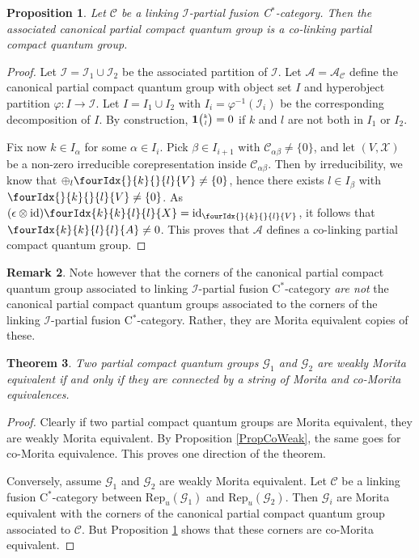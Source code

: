 \documentclass[10pt]{article}
\DeclareMathOperator{\id}{id}
\newcommand{\CatC}{\mathcal{C}}
\newcommand{\CatCC}{\mathscr{C}}
\newcommand{\Rep}{\mathrm{Rep}}
\newcommand{\Grt}[3]{#1{\tiny {\begin{pmatrix} #2\\#3\end{pmatrix}}}}
\newcommand{\UnitC}[2]{\Grt{\mathbf{1}}{#1}{#2}}
\newcommand{\Gr}[5]{\fourIdx{#2}{#4}{#3}{#5}{#1}}%
\newcommand{\Gru}[3]{\Gr{#1}{}{}{#2}{#3}}
\newtheorem{Theorem}{Theorem}[section]
\newtheorem{Prop}[Theorem]{Proposition}
\theoremstyle{definition}
\newtheorem{Rem}[Theorem]{Remark}
\numberwithin{equation}{section}
\begin{document}
\begin{Prop}\label{PropCoLink} Let $\CatCC$ be a linking $\mathscr{I}$-partial fusion C$^*$-category. Then the associated canonical partial compact quantum group is a co-linking partial compact quantum group. 
\end{Prop} 

\begin{proof} Let $\mathscr{I}= \mathscr{I}_1\cup \mathscr{I}_2$ be the associated partition of $\mathscr{I}$. Let $\mathscr{A} = \mathscr{A}_{\CatCC}$ define the canonical partial compact quantum group with object set $I$ and hyperobject partition $\varphi:I\rightarrow \mathscr{I}$. Let $I=I_1\cup I_2$ with $I_i = \varphi^{-1}(\mathscr{I}_i)$ be the corresponding decomposition of $I$. By construction, $\UnitC{k}{l}=0$ if $k$ and $l$ are not both in $I_1$ or $I_2$. 

Fix now $k\in I_{\alpha}$ for some $\alpha \in I_i$. Pick $\beta\in I_{i+1}$ with $\CatC_{\alpha\beta}\neq\{0\}$, and let $(V,\mathscr{X})$ be a non-zero irreducible corepresentation inside $\CatC_{\alpha\beta}$. Then by irreducibility, we know that $\oplus_l \Gru{V}{k}{l} \neq \{0\}$, hence there exists $l\in I_{\beta}$ with $\Gru{V}{k}{l}\neq \{0\}$. As $(\epsilon\otimes \id)\Gr{X}{k}{l}{k}{l} = \id_{\Gru{V}{k}{l}}$, it follows that $\Gr{A}{k}{l}{k}{l} \neq 0$. This proves that $\mathscr{A}$ defines a co-linking partial compact quantum group.
\end{proof} 

\begin{Rem} Note however that the corners of the canonical partial compact quantum group associated to linking $\mathscr{I}$-partial fusion C$^*$-category \emph{are not} the canonical partial compact quantum groups associated to the corners of the linking $\mathscr{I}$-partial fusion C$^*$-category. Rather, they are Morita equivalent copies of these.
\end{Rem} 

\begin{Theorem} Two partial compact quantum groups $\mathscr{G}_1$ and $\mathscr{G}_2$ are weakly Morita equivalent if and only if they are connected by a string of Morita and co-Morita equivalences. 
\end{Theorem}

\begin{proof} Clearly if two partial compact quantum groups are Morita equivalent, they are weakly Morita equivalent. By Proposition \ref{PropCoWeak}, the same goes for co-Morita equivalence. This proves one direction of the theorem. 

Conversely, assume $\mathscr{G}_1$ and $\mathscr{G}_2$ are weakly Morita equivalent. Let $\CatCC$ be a linking fusion C$^*$-category between $\Rep_u(\mathscr{G}_1)$ and $\Rep_u(\mathscr{G}_2)$. Then $\mathscr{G}_i$ are Morita equivalent with the corners of the canonical partial compact quantum group associated to $\CatCC$. But Proposition \ref{PropCoLink} shows that these corners are co-Morita equivalent. 
\end{proof} 
\end{document}
